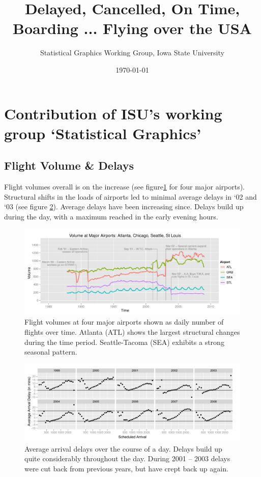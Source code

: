 \documentclass[11pt]{article}
\title{Delayed, Cancelled, On Time, Boarding ... Flying over the USA}
\author{Statistical Graphics Working Group, Iowa State University}
\date{\today}                                           %
\begin{document}
\section{Contribution of ISU's working group `Statistical Graphics'}
\subsection{Flight Volume \& Delays}
Flight volumes overall is on the increase (see figure\ref{volume} for four major airports).  Structural shifts in the loads of airports led to minimal average delays in `02 and `03 (see figure \ref{delays}). Average delays have been increasing since. Delays build up during the day, with a maximum reached in the early evening hours. 
\begin{figure}[htbp] %
   \centering
   \includegraphics[width=4.5in]{airports.pdf} 
   \caption{Flight volumes at four major airports shown as daily number of flights over time. Atlanta (ATL) shows the largest structural changes during the time period. Seattle-Tacoma (SEA) exhibits a strong seasonal pattern.}
   \label{volume}
\end{figure}

\begin{figure}[htbp] %
   \centering
   \includegraphics[width=5in]{arrdelay-crsarrtime.pdf} 
   \caption{Average arrival delays over the course of a day. Delays build up quite considerably throughout the day. During 2001 -- 2003 delays were  cut back from previous years, but have crept back up again.}
   \label{delays}
\end{figure}
\end{document}
